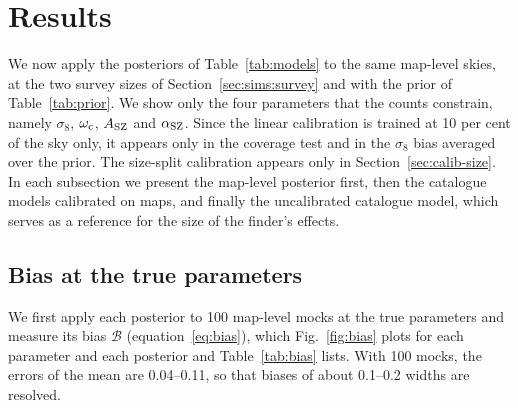 \section{Results}\label{sec:results}

We now apply the posteriors of Table~\ref{tab:models} to the same map-level skies, at the two survey sizes
of Section~\ref{sec:sims:survey} and with the prior of Table~\ref{tab:prior}. We show only the four
parameters that the counts constrain, namely $\sigma_8$, $\omega_\mathrm{c}$, $A_\mathrm{SZ}$ and $\alpha_\mathrm{SZ}$. Since the linear
calibration is trained at 10 per cent of the sky only, it appears only in the coverage test and in the
$\sigma_8$ bias averaged over the prior. The size-split calibration appears only in
Section~\ref{sec:calib-size}. In each subsection we present the map-level posterior first, then the
catalogue models calibrated on maps, and finally the uncalibrated catalogue model, which serves as a
reference for the size of the finder's effects.

\subsection{Bias at the true parameters}\label{sec:results:bias}

We first apply each posterior to 100 map-level mocks at the true parameters and measure its bias
$\mathcal{B}$ (equation~\ref{eq:bias}), which Fig.~\ref{fig:bias} plots for each parameter and each
posterior and Table~\ref{tab:bias} lists. With 100 mocks, the errors of the mean are
0.04--0.11, so that biases of about 0.1--0.2 widths are resolved.

